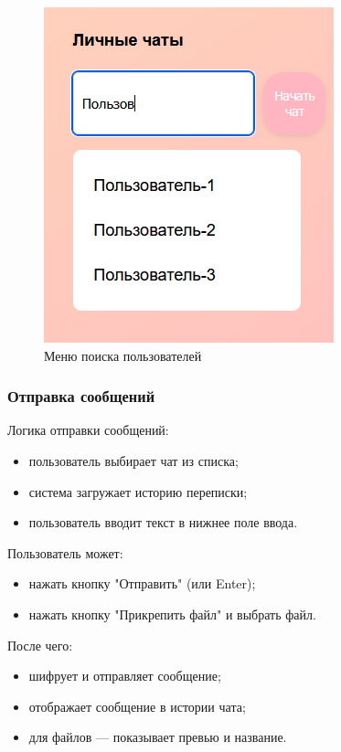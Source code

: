 \begin{figure}[!h]
	\centering
	\includegraphics[width=0.8\linewidth]{"images/Меню поиска пользователей"}
	\caption{Меню поиска пользователей}
	\label{fig:search-users}
\end{figure}

\subsubsection{Отправка сообщений}  
Логика отправки сообщений:  
\begin{itemize}  
	\item пользователь выбирает чат из списка;  
	\item система загружает историю переписки;  
	\item пользователь вводит текст в нижнее поле ввода.
\end{itemize}

Пользователь может:

\begin{itemize}
		\item нажать кнопку "Отправить" (или Enter);  
		\item нажать кнопку "Прикрепить файл" и выбрать файл.
\end{itemize}

После чего:

\begin{itemize}
		\item шифрует и отправляет сообщение;  
		\item отображает сообщение в истории чата;  
		\item для файлов — показывает превью и название.   
\end{itemize}

